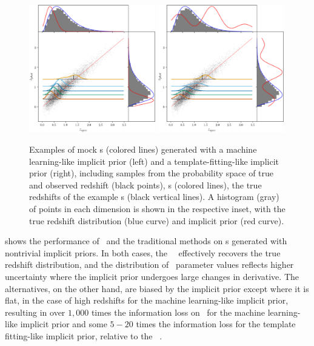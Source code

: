 \begin{figure}
	\includegraphics[width=0.49\textwidth]{figures/chippr/samplepzs_trpr.png}
	\includegraphics[width=0.49\textwidth]{figures/chippr/samplepzs_tmpr.png}
	\caption{
		Examples of mock \pzpdf s (colored lines) generated with a machine learning-like implicit prior (left) and a template-fitting-like implicit prior (right), including samples from the probability space of true and observed redshift (black points), \pzpdf s (colored lines), the true redshifts of the example \pzpdf s (black vertical lines).
		A histogram (gray) of points in each dimension is shown in the respective inset, with the true redshift distribution (blue curve) and implicit prior (red curve).
	}
\end{figure}

 shows the performance of \Chippr\ and the traditional methods on \pzpdf s generated with nontrivial implicit priors.
In both cases, the \Chippr\ \mmle\ effectively recovers the true redshift distribution, and the distribution of \nz\ parameter values reflects higher uncertainty where the implicit prior undergoes large changes in derivative.
The alternatives, on the other hand, are biased by the implicit prior except where it is flat, in the case of high redshifts for the machine learning-like implicit prior, resulting in over $1,000$ times the information loss on \nz\ for the machine learning-like implicit prior and some $5-20$ times the information loss for the template fitting-like implicit prior, relative to the \Chippr\ \mmle.

